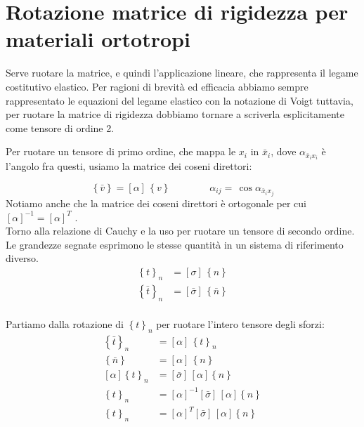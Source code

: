 \section{Rotazione matrice di rigidezza per materiali ortotropi}

Serve ruotare la matrice, e quindi l'applicazione lineare, che rappresenta il legame costitutivo elastico. Per ragioni di brevità ed efficacia abbiamo sempre rappresentato le equazioni del legame elastico con la notazione di Voigt tuttavia, per ruotare la matrice di rigidezza dobbiamo tornare a scriverla esplicitamente come tensore di ordine 2.

Per ruotare un tensore di primo ordine, che mappa le $x_i$ in $\bar{x}_i$, dove $\alpha_{\bar{x}_ix_i}$ è l'angolo fra questi, usiamo la matrice dei coseni direttori:

    \begin{equation*}
\left\{ \bar{v}\right\}
=\left[\alpha\right]\,\left\{ v\right\} \qquad\qquad \alpha_{ij}=\, \cos{\alpha_{\bar{x}_ix_j}}
\end{equation*}
Notiamo anche che la matrice dei coseni direttori è ortogonale per cui $[\alpha]^{-1}=[\alpha]^T $ .\\

Torno alla relazione di Cauchy e la uso per ruotare un tensore di secondo ordine. Le grandezze segnate esprimono le stesse quantità in un sistema di riferimento diverso.
\begin{align*}
\left\{ t\right\}_n&=\left[\sigma\right]\,\left\{n\right\}\\
\left\{ \bar{t}\right\}_n&=\left[\bar{\sigma}\right]\,\left\{\bar{n}\right\}\\
\end{align*}

Partiamo dalla rotazione di $\left\{ t\right\}_n$ per ruotare l'intero tensore degli sforzi:
\begin{align*}
\left\{ \bar{t}\right\}_n&=\left[\alpha\right]\,\left\{t\right\}_n\\
\left\{ \bar{n}\right\}&=\left[\alpha\right]\,\left\{n\right\}\\
\left[\alpha\right]\left\{ t\right\}_n&=\left[\bar{\sigma}\right]\,\left[\alpha\right]\left\{n\right\}\\
\left\{ t\right\}_n&=\left[\alpha\right]^{-1}\left[\bar{\sigma}\right]\,\left[\alpha\right]\left\{n\right\}\\
\left\{ t\right\}_n&=\left[\alpha\right]^T\left[\bar{\sigma}\right]\,\left[\alpha\right]\left\{n\right\}\\
\end{align*}

